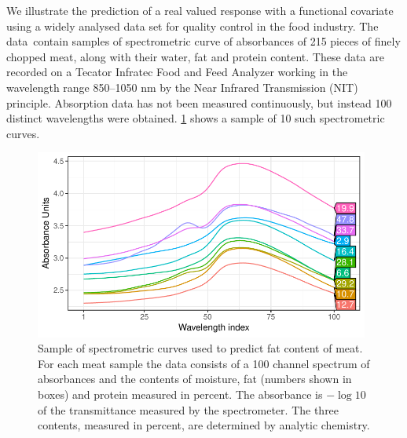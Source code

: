 \documentclass[showframe,11pt,twoside,openright]{report}\usepackage[]{graphicx}\usepackage[]{color}
\newenvironment{knitrout}{}{} %
\begin{document}
We illustrate the prediction of a real valued response with a functional covariate using a widely analysed data set for quality control in the food industry.
The data\footnotemark~contain samples of spectrometric curve of absorbances of 215 pieces of finely chopped meat, along with their water, fat and protein content.
These data are recorded on a Tecator Infratec Food and Feed Analyzer working in the wavelength range 850--1050 nm by the Near Infrared Transmission (NIT) principle.
Absorption data has not been measured continuously, but instead 100 distinct wavelengths were obtained. \cref{fig:tecator.data} shows a sample of 10 such spectrometric curves.


\begin{knitrout}
\color{fgcolor}\begin{figure}[htb]

{\centering \includegraphics[width=11cm]{figure/04-tecator_data-1} 

}

\caption[Sample of spectrometric curves used to predict fat content of meat]{Sample of spectrometric curves used to predict fat content of meat. For each meat sample the data consists of a 100 channel spectrum of absorbances and the contents of moisture, fat (numbers shown in boxes) and protein measured in percent. The absorbance is $-\log 10$ of the transmittance measured by the spectrometer. The three contents, measured in percent, are determined by analytic chemistry.}\label{fig:tecator.data}
\end{figure}


\end{knitrout}
\end{document}

